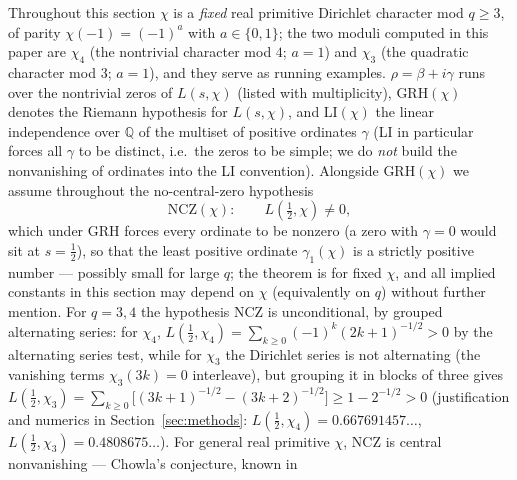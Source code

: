 Throughout this section $\chi$ is a \emph{fixed} real primitive
Dirichlet character mod $q\ge3$, of parity $\chi(-1)=(-1)^a$ with
$a\in\{0,1\}$; the two moduli computed in this paper are $\chi_4$ (the
nontrivial character mod $4$; $a=1$) and $\chi_3$ (the quadratic
character mod $3$; $a=1$), and they serve as running examples.
$\rho=\beta+i\gamma$ runs over the nontrivial zeros of
$L(s,\chi)$ (listed with multiplicity), GRH$(\chi)$ denotes the Riemann
hypothesis for $L(s,\chi)$, and LI$(\chi)$ the linear independence over
$\mathbb Q$ of the multiset of positive ordinates $\gamma$ (LI in
particular forces all $\gamma$ to be distinct, i.e.\ the zeros to be
simple; we do \emph{not} build the nonvanishing of ordinates into the
LI convention). Alongside GRH$(\chi)$ we assume throughout the
no-central-zero hypothesis
\[
\mathrm{NCZ}(\chi):\qquad L(\tfrac12,\chi)\neq0 ,
\]
which under GRH forces every ordinate to be nonzero (a zero with
$\gamma=0$ would sit at $s=\tfrac12$), so that the least positive
ordinate $\gamma_1(\chi)$ is a strictly positive number --- possibly
small for large $q$; the theorem is for fixed $\chi$, and all implied
constants in this section may depend on $\chi$ (equivalently on $q$)
without further mention. For $q=3,4$ the hypothesis NCZ is
unconditional, by grouped alternating series: for $\chi_4$,
$L(\tfrac12,\chi_4)=\sum_{k\ge0}(-1)^k(2k+1)^{-1/2}>0$ by the
alternating series test, while for $\chi_3$ the Dirichlet series is
not alternating (the vanishing terms $\chi_3(3k)=0$ interleave), but
grouping it in blocks of three gives
$L(\tfrac12,\chi_3)=\sum_{k\ge0}\bigl[(3k+1)^{-1/2}-(3k+2)^{-1/2}\bigr]
\ge1-2^{-1/2}>0$ (justification and numerics in
Section~\ref{sec:methods}: $L(\tfrac12,\chi_4)=0.667691457\ldots$,
$L(\tfrac12,\chi_3)=0.4808675\ldots$). For general real primitive
$\chi$, NCZ is central nonvanishing --- Chowla's conjecture, known in
